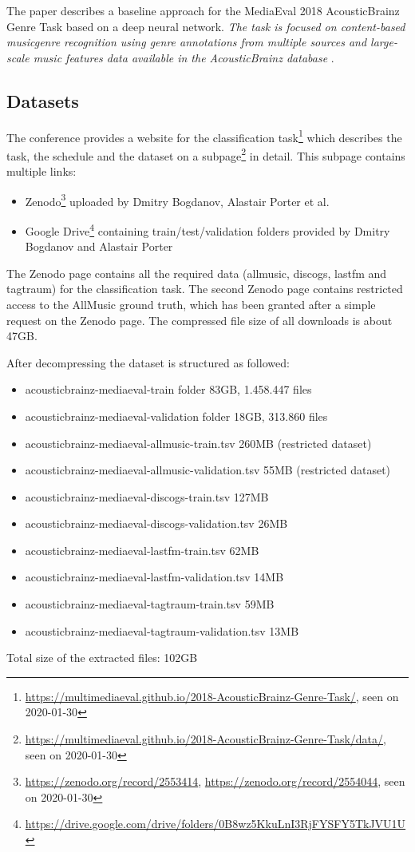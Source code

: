 \documentclass[sigconf,nonacm]{acmart}
\begin{document}
The paper describes a baseline approach for the MediaEval 2018 AcousticBrainz Genre Task based on a deep neural network.
\textit{The task is focused on content-based musicgenre recognition using genre annotations from multiple sources and large-scale music features data available in the AcousticBrainz database} \cite{MediaEval1}.

\subsection{Datasets}

The conference provides a website for the classification task\footnote{\url{https://multimediaeval.github.io/2018-AcousticBrainz-Genre-Task/}, seen on 2020-01-30} which describes the task, the schedule and the dataset on a subpage\footnote{\url{https://multimediaeval.github.io/2018-AcousticBrainz-Genre-Task/data/}, seen on 2020-01-30} in detail.
This subpage contains multiple links:
\begin{itemize}
    \item Zenodo\footnote{\url{https://zenodo.org/record/2553414}, \url{https://zenodo.org/record/2554044}, seen on 2020-01-30} uploaded by Dmitry Bogdanov, Alastair Porter et al.
    \item Google Drive\footnote{\url{https://drive.google.com/drive/folders/0B8wz5KkuLnI3RjFYSFY5TkJVU1U}} containing train/test/validation folders provided by Dmitry Bogdanov and Alastair Porter    
\end{itemize}


The Zenodo page contains all the required data (allmusic, discogs, lastfm and tagtraum) for the classification task. The second Zenodo page contains restricted access to the AllMusic ground truth, which has been granted after a simple request on the Zenodo page.
The compressed file size of all downloads is about 47GB.

After decompressing the dataset is structured as followed:
\begin{itemize}
    \item acousticbrainz-mediaeval-train folder 83GB, 1.458.447 files
    \item acousticbrainz-mediaeval-validation folder 18GB, 313.860 files
    \item acousticbrainz-mediaeval-allmusic-train.tsv 260MB (restricted dataset)
    \item acousticbrainz-mediaeval-allmusic-validation.tsv 55MB (restricted dataset)
    \item acousticbrainz-mediaeval-discogs-train.tsv 127MB
    \item acousticbrainz-mediaeval-discogs-validation.tsv 26MB
    \item acousticbrainz-mediaeval-lastfm-train.tsv 62MB
    \item acousticbrainz-mediaeval-lastfm-validation.tsv 14MB
    \item acousticbrainz-mediaeval-tagtraum-train.tsv 59MB
    \item acousticbrainz-mediaeval-tagtraum-validation.tsv 13MB
\end{itemize}
Total size of the extracted files: 102GB
\end{document}
